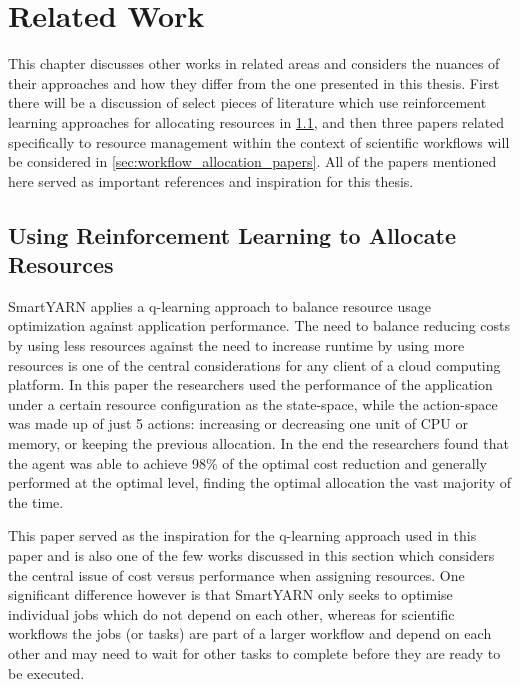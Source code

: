 
\cleardoublepage
\chapter{Related Work}
\label{cha:related_work}

This chapter discusses other works in related areas and considers the nuances of their approaches and how they differ from the one presented in this thesis. First there will be a discussion of select pieces of literature which use reinforcement learning approaches for allocating resources in \ref{sec:rl_allocation}, and then three papers related specifically to resource management within the context of scientific workflows will be considered in \ref{sec:workflow_allocation_papers}. All of the papers mentioned here served as important references and inspiration for this thesis. 


\section{Using Reinforcement Learning to Allocate Resources}
 \label{sec:rl_allocation}
 
SmartYARN \cite{smartYarn} applies a q-learning approach to balance resource usage optimization against application performance. The need to balance reducing costs by using less resources against the need to increase runtime by using more resources is one of the central considerations for any client of a cloud computing platform. In this paper the researchers used the performance of the application under a certain resource configuration as the state-space, while the action-space was made up of just 5 actions: increasing or decreasing one unit of CPU or memory, or keeping the previous allocation. In the end the researchers found that the agent was able to achieve 98\% of the optimal cost reduction and generally performed at the optimal level, finding the optimal allocation the vast majority of the time.

This paper served as the inspiration for the q-learning approach used in this paper and is also one of the few works discussed in this section which considers the central issue of cost versus performance when assigning resources. One significant difference however is that SmartYARN only seeks to optimise individual jobs which do not depend on each other, whereas for scientific workflows the jobs (or tasks) are part of a larger workflow and depend on each other and may need to wait for other tasks to complete before they are ready to be executed.

